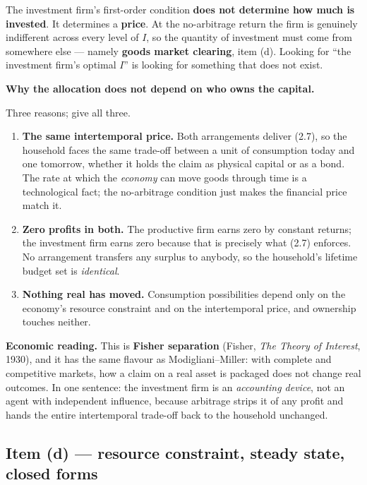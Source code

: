 \documentclass[11pt, a4paper]{article}
\newcommand{\passo}[1]{\medskip\noindent\textbf{#1}\par\nobreak}
\newcommand{\intuicao}[1]{%
  \medskip\noindent\textcolor{midblue}{\textbf{Economic reading.}} #1\par}
\begin{document}
\begin{tcolorbox}[trapbox, title={The subtlety almost everyone gets wrong}]
\small
The investment firm's first-order condition \textbf{does not determine how much is
invested}. It determines a \textbf{price}. At the no-arbitrage return the firm is genuinely
indifferent across every level of $I$, so the quantity of investment must come from
somewhere else --- namely \textbf{goods market clearing}, item (d). Looking for ``the
investment firm's optimal $I$'' is looking for something that does not exist.
\end{tcolorbox}

\passo{Why the allocation does not depend on who owns the capital.} Three reasons; give all
three.

\begin{enumerate}[label=\textbf{\arabic*.}, leftmargin=2em]
\item \textbf{The same intertemporal price.} Both arrangements deliver (2.7), so the
      household faces the same trade-off between a unit of consumption today and one
      tomorrow, whether it holds the claim as physical capital or as a bond. The rate at
      which the \emph{economy} can move goods through time is a technological fact; the
      no-arbitrage condition just makes the financial price match it.
\item \textbf{Zero profits in both.} The productive firm earns zero by constant returns; the
      investment firm earns zero because that is precisely what (2.7) enforces. No
      arrangement transfers any surplus to anybody, so the household's lifetime budget set
      is \emph{identical}.
\item \textbf{Nothing real has moved.} Consumption possibilities depend only on the
      economy's resource constraint and on the intertemporal price, and ownership touches
      neither.
\end{enumerate}

\intuicao{This is \textbf{Fisher separation} (Fisher, \emph{The Theory of Interest}, 1930),
and it has the same flavour as Modigliani--Miller: with complete and competitive markets,
how a claim on a real asset is packaged does not change real outcomes. In one sentence: the
investment firm is an \emph{accounting device}, not an agent with independent influence,
because arbitrage strips it of any profit and hands the entire intertemporal trade-off back
to the household unchanged.}

\subsection*{Item (d) --- resource constraint, steady state, closed forms}
\end{document}
